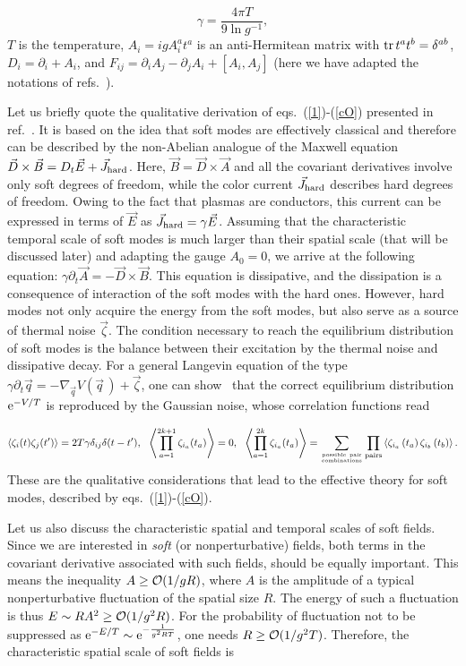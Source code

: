 \documentclass[a4paper,12pt]{article}
\begin{document}
\begin{equation}
\label{gam}
\gamma=\frac{4\pi T}{9\ln g^{-1}},
\end{equation}
$T$ is the temperature,
$A_i=igA_i^at^a$ is an anti-Hermitean matrix with
${\rm tr}{\,}t^at^b=\delta^{ab}$, $D_i=\partial_i+A_i$, and $F_{ij}=\partial_iA_j-\partial_jA_i+[A_i,A_j]$
(here we have adapted the notations of refs.~\cite{le, rev}).

Let us briefly quote the qualitative derivation
of eqs.~(\ref{1})-(\ref{cO}) presented in ref.~\cite{asy}. It is based on the idea that soft modes are effectively
classical and therefore can
be described by the non-Abelian analogue of the Maxwell equation
$\vec D\times\vec B=D_t\vec E+\vec J_{\rm hard}$. Here, $\vec B=\vec D\times\vec A$ and
all the covariant derivatives involve only soft degrees of freedom, while the color current $\vec J_{\rm hard}$
describes hard degrees of freedom. Owing to the fact that plasmas are conductors, this current can be expressed in terms
of $\vec E$ as $\vec J_{\rm hard}=\gamma\vec E$. Assuming that the characteristic temporal scale of soft modes is much
larger than their spatial scale (that will be discussed later) and adapting the gauge $A_0=0$, we arrive at the
following equation: $\gamma\partial_t\vec A=-\vec D\times\vec B$. This equation is dissipative, and the dissipation
is a consequence of interaction of the soft modes with the hard ones. However, hard modes not only acquire the energy from
the soft modes, but also serve as a source of thermal noise $\vec\zeta$. The condition necessary to reach the
equilibrium distribution of soft modes is the balance between their excitation by the thermal noise and dissipative decay.
For a general Langevin equation of the type $\gamma\partial_t\vec q=-\nabla_{\vec q}V(\vec q{\,})+\vec\zeta$,
one can show~\cite{zj} that the correct equilibrium distribution ${\rm e}^{-V/T}$ is reproduced by the Gaussian noise,
whose correlation functions read

$$\left<\zeta_i(t)\zeta_j(t')\right>=2T\gamma\delta_{ij}\delta(t-t'),~~
\left<\prod\limits_{a=1}^{2k+1}\zeta_{i_a}(t_a)\right>=0,~~
\left<\prod\limits_{a=1}^{2k}\zeta_{i_a}(t_a)\right>=\sum\limits_{{\rm possible~ pair}\atop {\rm combinations}}^{}
\prod\limits_{\rm pairs}^{}\left<\zeta_{i_a}\left(t_a\right)\zeta_{i_b}\left(t_b\right)\right>.$$
These are the qualitative considerations that lead to the effective theory for soft modes, described by eqs.~(\ref{1})-(\ref{cO}).

Let us also discuss the characteristic spatial and temporal scales of soft fields. Since we are interested in {\it soft}
(or nonperturbative) fields, both terms in the covariant derivative associated with such fields, should be equally important.
This means the inequality $A\ge {\cal O}(1/gR)$, where $A$ is the amplitude of a typical nonperturbative
fluctuation of the spatial size $R$. The energy of such a fluctuation is thus $E\sim RA^2\ge{\cal O}(1/g^2R)$.
For the probability of fluctuation not to be suppressed as ${\rm e}^{-E/T}\sim{\rm e}^{-\frac{1}{g^2RT}}$, one
needs $R\ge{\cal O}(1/g^2T)$. Therefore, the characteristic spatial scale of soft fields is
\end{document}
